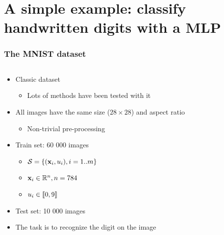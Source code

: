 \section[A simple example: MLP]{A simple example: classify handwritten digits with a \acl{MLP}}

\begin{frame}

  \frametitle{The MNIST dataset}

  \begin{columns}
    \begin{column}{0.5\textwidth}
      \begin{itemize}
      \item Classic dataset
        \begin{itemize}
        \item Lots of methods have been tested with it
        \end{itemize}
      \item<2-> All images have the same size ($28 \times 28$) and aspect ratio
        \begin{itemize}
        \item Non-trivial pre-processing
        \end{itemize}
      \item<2-> Train set: 60 000 images
        \begin{itemize}
        \item $\mathcal{S} =
          \left \lbrace {\ensuremath{\left ( {\mathbf{x}_{i}}, {u_{i}} \right )}} , {i=1..m} \right \rbrace$
        \item $\mathbf{x}_i \in \mathbb{R}^{n}, n = 784$
        \item $u_i \in \left \llbracket {0}, {9} \right \rrbracket$
        \end{itemize}
      \item<2-> Test set: 10 000 images
      \item<3-> The task is to recognize the digit on the image
      \end{itemize}
    \end{column}
    \begin{column}{0.5\textwidth}

\end{column}
\end{columns}
\end{frame}
